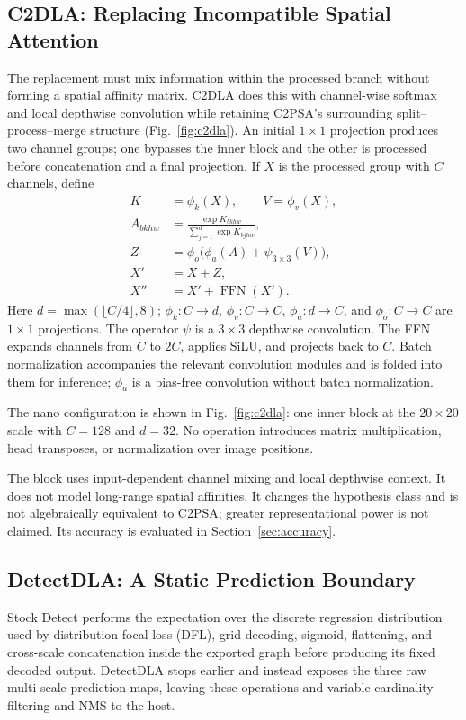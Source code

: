 \subsection{C2DLA: Replacing Incompatible Spatial Attention}
\label{sec:c2dla}
The replacement must mix information within the processed branch without forming a spatial affinity matrix. C2DLA does this with channel-wise softmax and local depthwise convolution while retaining C2PSA's surrounding split--process--merge structure (Fig.~\ref{fig:c2dla}). An initial $1\times1$
projection produces two channel groups; one bypasses the inner block and the
other is processed before concatenation and a final projection. If $X$ is the
processed group with $C$ channels, define
\begin{align}
 K &= \phi_k(X), \qquad V=\phi_v(X), \label{eq:kv}\\
 A_{bkhw} &= \frac{\exp K_{bkhw}}{\sum_{j=1}^{d}\exp K_{bjhw}},
 \label{eq:chansoftmax}\\
 Z &= \phi_o\bigl(\phi_a(A)+\psi_{3\times3}(V)\bigr),
 \label{eq:mix}\\
 X' &= X+Z, \label{eq:res1}\\
 X'' &= X'+\operatorname{FFN}(X'). \label{eq:res2}
\end{align}
Here $d=\max(\lfloor C/4\rfloor,8)$; $\phi_k:C\to d$,
$\phi_v:C\to C$, $\phi_a:d\to C$, and $\phi_o:C\to C$ are
$1\times1$ projections. The operator $\psi$ is a $3\times3$ depthwise
convolution. The FFN expands channels from $C$ to $2C$, applies SiLU, and
projects back to $C$. Batch normalization accompanies the relevant convolution
modules and is folded into them for inference; $\phi_a$ is a bias-free
convolution without batch normalization.

The nano configuration is shown in Fig.~\ref{fig:c2dla}: one inner block at the
$20\times20$ scale with $C=128$ and $d=32$. No operation introduces matrix
multiplication, head transposes, or normalization over image positions.

The block uses input-dependent channel mixing and local depthwise context.
It does not model long-range spatial affinities. It changes the hypothesis class
and is not algebraically equivalent to C2PSA; greater representational power
is not claimed. Its accuracy is evaluated in Section~\ref{sec:accuracy}.

\subsection{DetectDLA: A Static Prediction Boundary}
\label{sec:boundary}
Stock Detect performs the expectation over the discrete regression distribution used by distribution focal loss (DFL), grid decoding, sigmoid, flattening, and cross-scale concatenation inside the exported graph before producing its fixed decoded output. DetectDLA stops earlier and instead exposes the three raw multi-scale prediction maps, leaving these operations and variable-cardinality filtering and NMS to the host.

